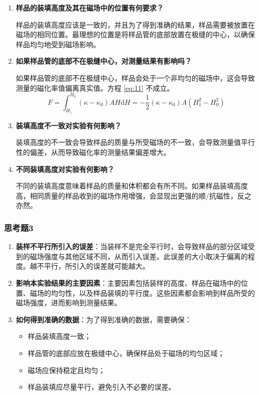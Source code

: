 \documentclass[cn,hazy,pku,12pt,normal,math=newtx,cite=super]{elegantnote}
\begin{document}
\begin{enumerate}
    \item \textbf{样品的装填高度及其在磁场中的位置有何要求？}
    
    样品的装填高度应该是一致的，并且为了得到准确的结果，样品需要被放置在磁场的相同位置。最理想的位置是将样品管的底部放置在极缝的中心，以确保样品均匀地受到磁场影响。
    
    \item \textbf{如果样品管的底部不在极缝中心，对测量结果有影响吗？}
    
    如果样品管的底部不在极缝中心，样品会处于一个非均匀的磁场中，这会导致测量的磁化率值偏离真实值。方程 \eqref{eq:11} 不成立。
    \begin{equation}\label{eq:11}
        F = \int_{H_1}^{H_0}(\kappa-\kappa_0)AH\mathrm{d}H=-\frac{1}{2}(\kappa-\kappa_0)A(H_1^2-H_0^2)
    \end{equation}
    
    \item \textbf{装填高度不一致对实验有何影响？}
    
    装填高度的不一致会导致样品的质量与所受磁场的不一致，会导致测量值平行性的偏差，从而导致磁化率的测量结果偏差增大。
    
    \item \textbf{不同装填高度对实验有何影响？}
    
    不同的装填高度意味着样品的质量和体积都会有所不同。如果样品装填高度高，相同质量的样品收到的磁场作用增强，会显现出更强的顺/抗磁性，反之亦然。
\end{enumerate}

\subsubsection*{思考题3}

\begin{enumerate}
    \item \textbf{装样不平行所引入的误差}：当装样不是完全平行时，会导致样品的部分区域受到的磁场强度与其他区域不同，从而引入误差。此误差的大小取决于偏离的程度。越不平行，所引入的误差就可能越大。
    
    \item \textbf{影响本实验结果的主要因素}：主要因素包括装样的高度、样品在磁场中的位置、磁场的均匀性，以及样品装填的平行度。这些因素都会影响到样品所受的磁场强度，进而影响到测量结果。
    
    \item \textbf{如何得到准确的数据}：为了得到准确的数据，需要确保：
    \begin{itemize}
        \item 样品装填高度一致；
        \item 样品管的底部应放在极缝中心，确保样品处于磁场的均匀区域；
        \item 磁场应保持稳定且均匀；
        \item 样品装填应尽量平行，避免引入不必要的误差。
    \end{itemize}
\end{enumerate}
\end{document}
